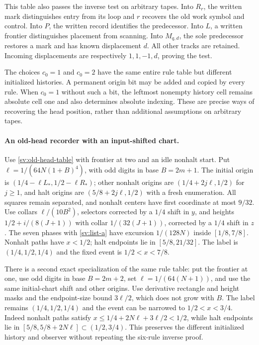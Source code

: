 This table also passes the inverse test on arbitrary tapes.  Into $R_r$,
the written mark distinguishes entry from its loop and $r$ recovers
the old work symbol and control.  Into $P$, the written record identifies
the predecessor.  Into $L$, a written frontier distinguishes placement
from scanning.  Into $M_{q,d}$, the sole predecessor restores a mark and
has known displacement $d$.  All other tracks are retained.  Incoming
displacements are respectively $1,1,-1,d$, proving the test.

The choices $c_0=1$ and $c_0=2$ have the same entire rule table but
different initialized histories.  A permanent origin bit may be added
and copied by every rule.  When $c_0=1$ without such a bit, the leftmost
nonempty history cell remains absolute cell one and also determines
absolute indexing.  These are precise ways of recovering the head
position, rather than additional assumptions on arbitrary tapes.

\paragraph{An old-head recorder with an input-shifted chart.}
Use \eqref{sv:old-head-table} with frontier at two and an idle
nonhalt start.  Put $\ell=1/(64N(1+B)^4)$, with odd digits in
base $B=2m+1$.  The initial origin is
$(1/4-\ell L_*,1/2-\ell R_*)$; other nonhalt origins are
$(1/4+2j\ell,1/2)$ for $j\ge1$, and halt origins are
$(5/8+2j\ell,1/2)$ with a fresh enumeration.  All squares remain
separated, and nonhalt centers have first coordinate at most $9/32$.
Use collars $\ell/(10B^2)$, selectors corrected by a $1/4$ shift
in $y$, and heights $1/2+i/(8(J+1))$ with collar
$1/(32(J+1))$, corrected by a $1/4$ shift in $z$.
The seven phases with \eqref{sv:list-a} have excursion
$1/(128N)$ inside $[1/8,7/8]$.  Nonhalt paths have $x<1/2$;
halt endpoints lie in $[5/8,21/32]$.  The label is
$(1/4,1/2,1/4)$ and the fixed event is $1/2<x<7/8$.

There is a second exact specialization of the same rule table: put the
frontier at one, use odd digits in base $B=2m+2$, set
$\ell=1/(64(N+1))$, and use the same initial-chart shift and other
origins.  Use derivative rectangle and height masks and the endpoint-size
bound $3\ell/2$, which does not grow with $B$.  The label remains
$(1/4,1/2,1/4)$ and the event can be narrowed to $1/2<x<3/4$.
Indeed nonhalt paths satisfy
$x\le1/4+2N\ell+3\ell/2<1/2$, while halt endpoints lie
in $[5/8,5/8+2N\ell]\subset(1/2,3/4)$.
This preserves the different initialized history and observer without
repeating the six-rule inverse proof.

